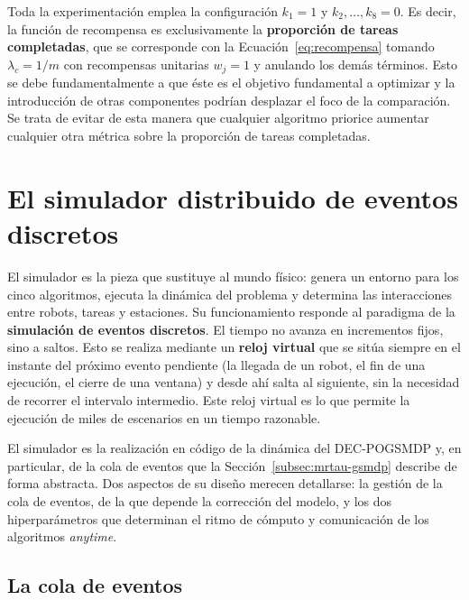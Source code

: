 Toda la experimentación emplea la configuración $k_1=1$ y $k_2,\dots,k_8 = 0$. Es decir, la función de recompensa es exclusivamente la \textbf{proporción de tareas completadas}, que se corresponde con la Ecuación~\eqref{eq:recompensa} tomando $\lambda_c=1/m$ con recompensas unitarias $w_j=1$ y anulando los demás términos. Esto se debe fundamentalmente a que éste es el objetivo fundamental a optimizar y la introducción de otras componentes podrían desplazar el foco de la comparación. Se trata de evitar de esta manera que cualquier algoritmo priorice aumentar cualquier otra métrica sobre la proporción de tareas completadas.

\section{El simulador distribuido de eventos discretos} \label{sec:mat-simulador}

El simulador es la pieza que sustituye al mundo físico: genera un entorno para los cinco algoritmos, ejecuta la dinámica del problema y determina las interacciones entre robots, tareas y estaciones. Su funcionamiento responde al paradigma de la \textbf{simulación de eventos discretos}. El tiempo no avanza en incrementos fijos, sino a saltos. Esto se realiza mediante un \textbf{reloj virtual} que se sitúa siempre en el instante del próximo evento pendiente (la llegada de un robot, el fin de una ejecución, el cierre de una ventana) y desde ahí salta al siguiente, sin la necesidad de recorrer el intervalo intermedio. Este reloj virtual es lo que permite la ejecución de miles de escenarios en un tiempo razonable.


El simulador es la realización en código de la dinámica del DEC-POGSMDP y, en particular, de la cola de eventos que la Sección~\ref{subsec:mrtau-gsmdp} describe de forma abstracta. Dos aspectos de su diseño merecen detallarse: la gestión de la cola de eventos, de la que depende la corrección del modelo, y los dos hiperparámetros que determinan el ritmo de cómputo y comunicación de los algoritmos \textit{anytime}.

\subsection{La cola de eventos} \label{subsec:mat-cola}

